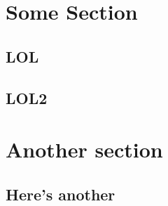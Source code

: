 \section{Some Section}
\subsection{LOL}
\lipsum
\subsection{LOL2}
\lipsum

\section{Another section}
\subsection{Here's another}
\lipsum
